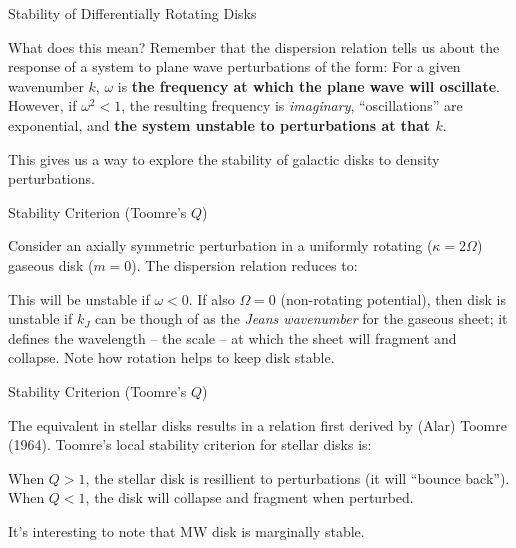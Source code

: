\documentclass[letterpaper,landscape]{slides}
\begin{document}
\begin{slide}

\begin{center}
{\large \color{red} 
                 Stability of Differentially Rotating Disks }
\end{center}

What does this mean? Remember that the dispersion relation tells us about the response of
a system to plane wave perturbations of the form:
For a given wavenumber $k$, $\omega$ is {\bf the frequency at which the plane
wave will oscillate}. However, if $\omega^2 < 1$, the resulting frequency
is {\em imaginary}, ``oscillations'' are exponential, and {\bf the system
unstable to perturbations at that $k$}.

This gives us a way to explore the stability of galactic disks
to density perturbations.

\vfill
\end{slide}

\begin{slide}

\begin{center}
{\large \color{red} 
                 Stability Criterion (Toomre's $Q$) }
\end{center}

Consider an axially symmetric perturbation in a uniformly rotating ($\kappa = 2\Omega$)
gaseous disk ($m = 0$). The dispersion relation reduces to:

This will be unstable if $\omega < 0$. If also $\Omega = 0$ (non-rotating potential), then
disk is unstable if
$k_J$ can be though of as the {\em Jeans wavenumber} for the gaseous sheet; it defines
the wavelength -- the scale -- at which the sheet will fragment and collapse. Note 
how rotation helps to keep disk stable.

\end{slide}

\begin{slide}

\begin{center}
{\large \color{red} 
                 Stability Criterion (Toomre's $Q$) }
\end{center}

The equivalent in stellar disks results in a relation first derived by (Alar) 
Toomre (1964). Toomre’s local stability criterion for stellar disks is:

When $Q > 1$, the stellar disk is resillient to perturbations (it will ``bounce
back''). When $Q < 1$, the disk will collapse and fragment when perturbed.

It's interesting to note that MW disk is marginally stable.

\end{slide}
\end{document}

